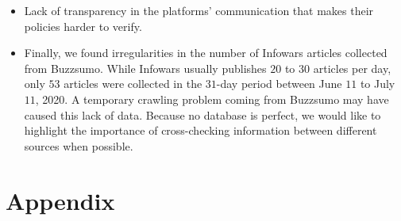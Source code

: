 \documentclass{article}
\begin{document}
{\begin{itemize}
	\item Lack of transparency in the platforms’ communication that makes their policies harder to verify.

	\item Finally, we found irregularities in the number of Infowars articles collected from Buzzsumo. While Infowars usually publishes $20$ to $30$ articles per day, only $53$ articles were collected in the $31$-day period between June $11$ to July $11$, 2020. A temporary crawling problem coming from Buzzsumo may have caused this lack of data. Because no database is perfect, we would like to highlight the importance of cross-checking information between different sources when possible. 
\end{itemize}
}


 

{}


\newpage 

\section{Appendix}
\end{document}

